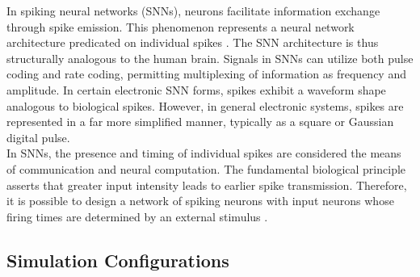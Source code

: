 


In spiking neural networks (SNNs), neurons facilitate information exchange through spike emission. This phenomenon represents a neural network architecture predicated on individual spikes \cite{liu2014memristor}. The SNN architecture is thus structurally analogous to the human brain. Signals in SNNs can utilize both pulse coding and rate coding, permitting multiplexing of information as frequency and amplitude. In certain electronic SNN forms, spikes exhibit a waveform shape analogous to biological spikes. However, in general electronic systems, spikes are represented in a far more simplified manner, typically as a square or Gaussian digital pulse.\\

\noindent In SNNs, the presence and timing of individual spikes are considered the means of communication and neural computation. The fundamental biological principle asserts that greater input intensity leads to earlier spike transmission. Therefore, it is possible to design a network of spiking neurons with input neurons whose firing times are determined by an external stimulus \cite{serrano2013stdp}.

\subsection[Simulation Configurations]{Simulation Configurations}

